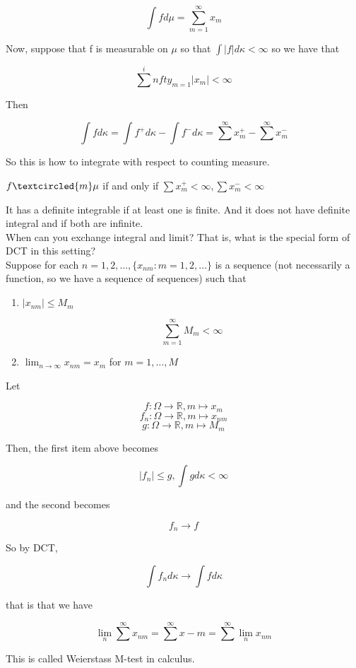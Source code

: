 \documentclass[11pt,fleqn]{book} %
\begin{document}
\begin{example}
			$$\int f d\mu = \sum^\infty_{m=1} x_m $$

	Now, suppose that f is measurable on $\mu$ so that $\int |f| d\kappa < \infty$ so we have that 

			$$\sum^infty_{m=1} |x_m| < \infty $$

	Then 

			$$\int f d\kappa = \int f^+ d\kappa - \int f^- d \kappa = \sum^\infty x_m^+ - \sum^\infty x_m^- $$

	So this is how to integrate with respect to counting measure. 

	$f \textcircled{m} \mu$ if and only if  $\sum x_m^{+} < \infty, \sum x_m^{-} < \infty$ 

	It has a definite integrable if at least one is finite. And it does not have definite integral and if both are infinite.\\


	When can you exchange integral and limit? That is, what is the special form of DCT in this setting?\\

	Suppose for each $n = 1, 2, \dots, \{x_{nm}: m = 1, 2, \dots\}$ is a sequence (not necessarily a function, so we have a sequence of sequences) such that 

			\begin{enumerate}
				\item $|x_{nm}| \leq M_m$

						$$\sum^\infty_{m=1} M_m < \infty $$ 
				\item $\lim_{n \rightarrow \infty} x_{nm} = x_m$ for $m = 1, \dots, M$
			\end{enumerate}

	Let 

			$$f: \Omega \rightarrow\mathbb{R}, m \mapsto x_m $$
			$$f_n: \Omega \rightarrow\mathbb{R}, m \mapsto x_{nm} $$
			$$g: \Omega \rightarrow\mathbb{R}, m \mapsto M_m $$

	Then, the first item above becomes 

			$$ |f_n| \leq g, \int g d\kappa < \infty$$

		and the second becomes

			$$f_n \rightarrow f $$

	So by DCT, 

			$$\int f_n d\kappa \rightarrow \int f d \kappa $$


	that is that we have 

			$$\lim_n \sum^\infty x_{nm} = \sum^\infty x-m = \sum^\infty \lim_n x_{nm} $$


	This is called Weierstass M-test in calculus. 

\end{example}
\end{document}
